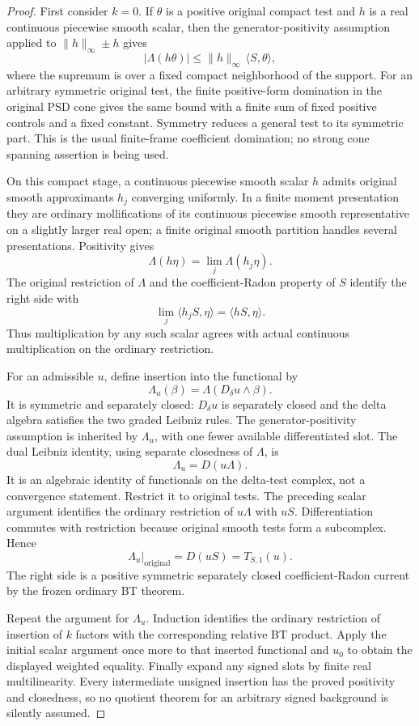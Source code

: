 \documentclass[11pt,a4paper]{article}
\numberwithin{equation}{section}
\theoremstyle{definition}
\theoremstyle{remark}
\begin{document}
\begin{proof}
First consider $k=0$.  If $\theta$ is a positive original compact
test and $h$ is a real continuous piecewise smooth scalar, then
the generator-positivity assumption applied to
$\|h\|_\infty\pm h$ gives
\[
                 |\Lambda(h\theta)|
                     \leq \|h\|_\infty\,\langle S,\theta\rangle,
\]
where the supremum is over a fixed compact neighborhood of the
support.  For an arbitrary symmetric original test, the finite
positive-form domination in the original PSD cone gives the same
bound with a finite sum of fixed positive controls and a fixed
constant.  Symmetry reduces a general test to its symmetric part.
This is the usual finite-frame coefficient domination; no strong
cone spanning assertion is being used.

On this compact stage, a continuous piecewise smooth scalar $h$
admits original smooth approximants $h_j$ converging uniformly.
In a finite moment presentation they are ordinary mollifications
of its continuous piecewise smooth representative on a slightly
larger real open; a finite original smooth partition handles
several presentations.  Positivity gives
\[
                      \Lambda(h\eta)=\lim_j\Lambda(h_j\eta).
\]
The original restriction of $\Lambda$ and the coefficient-Radon
property of $S$ identify the right side with
\[
                      \lim_j\langle h_jS,\eta\rangle
                              =\langle hS,\eta\rangle.
\]
Thus multiplication by any such scalar agrees with actual
continuous multiplication on the ordinary restriction.

For an admissible $u$, define insertion into the functional by
\[
                    \Lambda_u(\beta)
                         =\Lambda(D_\delta u\wedge\beta).
\]
It is symmetric and separately closed: $D_\delta u$ is separately
closed and the delta algebra satisfies the two graded Leibniz
rules.  The generator-positivity assumption is inherited by
$\Lambda_u$, with one fewer available differentiated slot.
The dual Leibniz identity, using separate closedness of
$\Lambda$, is
\[
                         \Lambda_u=D(u\Lambda).
\]
It is an algebraic identity of functionals on the delta-test
complex, not a convergence statement.  Restrict it to original
tests.  The preceding scalar argument identifies the ordinary
restriction of $u\Lambda$ with $uS$.  Differentiation commutes
with restriction because original smooth tests form a
subcomplex.  Hence
\[
                       \Lambda_u\big|_{\mathrm{original}}
                                  =D(uS)=T_{S,1}(u).
\]
The right side is a positive symmetric separately closed
coefficient-Radon current by the frozen ordinary BT theorem.

Repeat the argument for $\Lambda_u$.  Induction identifies the
ordinary restriction of insertion of $k$ factors with the
corresponding relative BT product.  Apply the initial scalar
argument once more to that inserted functional and $u_0$ to
obtain the displayed weighted equality.  Finally expand any
signed slots by finite real multilinearity.  Every intermediate
unsigned insertion has the proved positivity and closedness,
so no quotient theorem for an arbitrary signed background is
silently assumed.
\end{proof}
\end{document}
